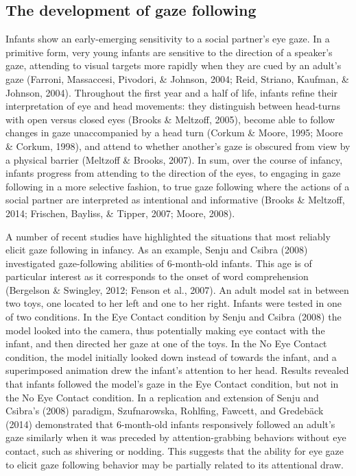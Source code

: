 \documentclass[,man,floatsintext]{apa6}
\begin{document}
\hypertarget{the-development-of-gaze-following}{%
\subsection{The development of gaze following}\label{the-development-of-gaze-following}}

Infants show an early-emerging sensitivity to a social partner's eye gaze. In a primitive form, very young infants are sensitive to the direction of a speaker's gaze, attending to visual targets more rapidly when they are cued by an adult's gaze (Farroni, Massaccesi, Pivodori, \& Johnson, 2004; Reid, Striano, Kaufman, \& Johnson, 2004). Throughout the first year and a half of life, infants refine their interpretation of eye and head movements: they distinguish between head-turns with open versus closed eyes (Brooks \& Meltzoff, 2005), become able to follow changes in gaze unaccompanied by a head turn (Corkum \& Moore, 1995; Moore \& Corkum, 1998), and attend to whether another's gaze is obscured from view by a physical barrier (Meltzoff \& Brooks, 2007). In sum, over the course of infancy, infants progress from attending to the direction of the eyes, to engaging in gaze following in a more selective fashion, to true gaze following where the actions of a social partner are interpreted as intentional and informative (Brooks \& Meltzoff, 2014; Frischen, Bayliss, \& Tipper, 2007; Moore, 2008).

A number of recent studies have highlighted the situations that most reliably elicit gaze following in infancy. As an example, Senju and Csibra (2008) investigated gaze-following abilities of 6-month-old infants. This age is of particular interest as it corresponds to the onset of word comprehension (Bergelson \& Swingley, 2012; Fenson et al., 2007). An adult model sat in between two toys, one located to her left and one to her right. Infants were tested in one of two conditions. In the Eye Contact condition by Senju and Csibra (2008) the model looked into the camera, thus potentially making eye contact with the infant, and then directed her gaze at one of the toys. In the No Eye Contact condition, the model initially looked down instead of towards the infant, and a superimposed animation drew the infant's attention to her head. Results revealed that infants followed the model's gaze in the Eye Contact condition, but not in the No Eye Contact condition. In a replication and extension of Senju and Csibra's (2008) paradigm, Szufnarowska, Rohlfing, Fawcett, and Gredebäck (2014) demonstrated that 6-month-old infants responsively followed an adult's gaze similarly when it was preceded by attention-grabbing behaviors without eye contact, such as shivering or nodding. This suggests that the ability for eye gaze to elicit gaze following behavior may be partially related to its attentional draw.
\end{document}
